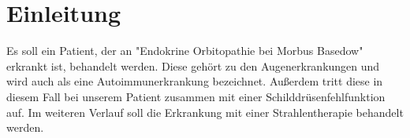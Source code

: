 \section{Einleitung}
\label{sec:Einleitung}
Es soll ein Patient, der an "Endokrine Orbitopathie bei Morbus Basedow" erkrankt ist, behandelt werden. Diese gehört zu den Augenerkrankungen und wird auch als eine Autoimmunerkrankung bezeichnet. \cite{Endokrine} Außerdem tritt diese in diesem Fall bei unserem Patient zusammen mit einer Schilddrüsenfehlfunktion auf. Im weiteren Verlauf soll die Erkrankung mit einer Strahlentherapie behandelt werden.
